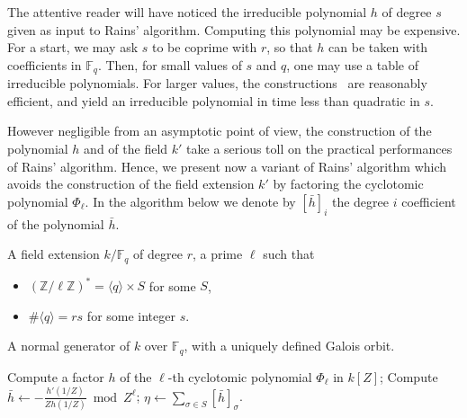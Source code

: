 \documentclass[12pt]{article}
\theoremstyle{plain}
\theoremstyle{definition}
\def\Z{\ensuremath{\mathbb{Z}}}
\def\F{\ensuremath{\mathbb{F}}}
\newcounter{algorithm}
\begin{document}
The attentive reader will have noticed the irreducible polynomial $h$
of degree $s$ given as input to Rains' algorithm. Computing this
polynomial may be expensive. For a start, we may ask $s$ to be coprime
with $r$, so that $h$ can be taken with coefficients in $\F_q$. Then,
for small values of $s$ and $q$, one may use a table of irreducible
polynomials. For larger values, the
constructions~\cite{couveignes+lercier11,DeDoSc13,DeFeo:2014:FAA:2608628.2608672}
are reasonably efficient, and yield an irreducible polynomial in time
less than quadratic in $s$.

However negligible from an asymptotic point of view, the construction
of the polynomial $h$ and of the field $k'$ take a serious toll on the
practical performances of Rains' algorithm. Hence, we present now a
variant of Rains' algorithm which avoids the construction of the field
extension $k'$ by factoring the cyclotomic polynomial $\Phi_\ell$. In
the algorithm below we denote by $[\bar{h}]_i$ the degree $i$ coefficient
of the polynomial $\bar{h}$.

\begin{algorithm}
  \label{algorithm:rains-cyclo-2}
  \begin{algorithmic}[1]
    \REQUIRE A field extension $k/\F_q$ of degree $r$, a prime $\ell$ such that
    \begin{itemize}
    \item $(\Z/\ell\Z)^\ast = \langle q\rangle \times S$ for some $S$,
    \item $\#\langle q\rangle = rs$ for some integer $s$.
    \end{itemize}
    \ENSURE A normal generator of $k$ over $\F_q$,
    with a uniquely defined Galois orbit.
    
    \STATE Compute a factor $h$ of the $\ell$-th cyclotomic polynomial $\Phi_\ell$ in $k[Z]$; 
    \STATE Compute $\bar{h} \leftarrow -\frac{h'(1/Z)}{Zh(1/Z)} \bmod Z^\ell$;
    \RETURN\label{algorithm:rains-cyclo:period} $\eta \leftarrow \sum_{\sigma\in S}[\bar{h}]_\sigma$.
  \end{algorithmic}
\end{algorithm}
\end{document}
